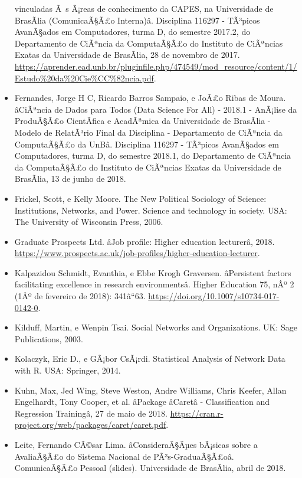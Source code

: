\documentclass[]{article}
\begin{document}
\begin{itemize}
  vinculadas Ã~s Ã¡reas de conhecimento da CAPES, na Universidade de
  BrasÃ­lia (ComunicaÃ§Ã£o Interna)â. Disciplina 116297 - TÃ³picos
  AvanÃ§ados em Computadores, turma D, do semestre 2017.2, do
  Departamento de CiÃªncia da ComputaÃ§Ã£o do Instituto de CiÃªncias
  Exatas da Universidade de BrasÃ­lia, 28 de novembro de 2017.
  \url{https://aprender.ead.unb.br/pluginfile.php/474549/mod_resource/content/1/Estudo\%20da\%20Cie\%CC\%82ncia.pdf}.
\item
  Fernandes, Jorge H C, Ricardo Barros Sampaio, e JoÃ£o Ribas de Moura.
  âCiÃªncia de Dados para Todos (Data Science For All) - 2018.1 -
  AnÃ¡lise da ProduÃ§Ã£o CientÃ­fica e AcadÃªmica da Universidade de
  BrasÃ­lia - Modelo de RelatÃ³rio Final da Disciplina - Departamento de
  CiÃªncia da ComputaÃ§Ã£o da UnBâ. Disciplina 116297 - TÃ³picos
  AvanÃ§ados em Computadores, turma D, do semestre 2018.1, do
  Departamento de CiÃªncia da ComputaÃ§Ã£o do Instituto de CiÃªncias
  Exatas da Universidade de BrasÃ­lia, 13 de junho de 2018.
\item
  Frickel, Scott, e Kelly Moore. The New Political Sociology of Science:
  Institutions, Networks, and Power. Science and technology in society.
  USA: The University of Wisconsin Press, 2006.
\item
  Graduate Prospects Ltd. âJob profile: Higher education lecturerâ,
  2018.
  \url{https://www.prospects.ac.uk/job-profiles/higher-education-lecturer}.
\item
  Kalpazidou Schmidt, Evanthia, e Ebbe Krogh Graversen. âPersistent
  factors facilitating excellence in research environmentsâ. Higher
  Education 75, nÂº 2 (1Âº de fevereiro de 2018): 341â``63.
  \url{https://doi.org/10.1007/s10734-017-0142-0}.
\item
  Kilduff, Martin, e Wenpin Tsai. Social Networks and Organizations. UK:
  Sage Publications, 2003.
\item
  Kolaczyk, Eric D., e GÃ¡bor CsÃ¡rdi. Statistical Analysis of Network
  Data with R. USA: Springer, 2014.
\item
  Kuhn, Max, Jed Wing, Steve Weston, Andre Williams, Chris Keefer, Allan
  Engelhardt, Tony Cooper, et al. âPackage âCaretâ -
  Classification and Regression Trainingâ, 27 de maio de 2018.
  \url{https://cran.r-project.org/web/packages/caret/caret.pdf}.
\item
  Leite, Fernando CÃ©sar Lima. âConsideraÃ§Ãµes bÃ¡sicas sobre a
  AvaliaÃ§Ã£o do Sistema Nacional de PÃ³s-GraduaÃ§Ã£oâ. ComunicaÃ§Ã£o
  Pessoal (slides). Universidade de BrasÃ­lia, abril de 2018.

\end{itemize}
\end{document}
